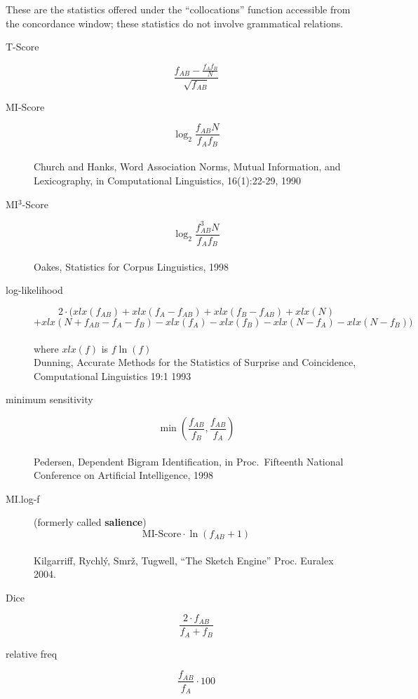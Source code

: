 \documentclass{article}
\begin{document}
These are the statistics offered under the ``collocations'' function accessible from the concordance window; these statistics do not involve grammatical relations.

\begin{description}
\item[T-Score] $$\frac{f_{AB} - \frac{f_A  f_B}{N}}{\sqrt{f_{AB}}}$$

\item[MI-Score] $$\log_2 \frac{f_{AB}  N}{f_A  f_B}$$
\\Church and Hanks, Word Association Norms,
 Mutual Information, and Lexicography, in Computational Linguistics,
 16(1):22-29, 1990

\item[MI$^3$-Score] $$\log_2 \frac{f_{AB}^3  N}{f_A  f_B}$$
\\Oakes, Statistics for Corpus Linguistics, 1998

\item[log-likelihood] $$2 \cdot (xlx(f_{AB}) + xlx(f_A - f_{AB}) + xlx(f_B - f_{AB}) + xlx(N)$$
		$$+ xlx (N + f_{AB} - f_A - f_B) - xlx(f_A) - xlx(f_B) - xlx(N - f_A) - xlx(N - f_B)) $$
\\where $xlx(f)$ is $ f  \ln (f)$
\\Dunning, Accurate Methods for the Statistics of Surprise and
 Coincidence, Computational Linguistics 19:1 1993

\item[minimum sensitivity] $$\min (\frac{f_{AB}}{f_B},\frac{f_{AB}}{f_A})$$
\\Pedersen, Dependent Bigram Identification, in Proc.\
  Fifteenth National Conference on Artificial Intelligence, 1998


\item[MI.log-f] (formerly called {\bf salience}) $$\text{MI-Score} \cdot \ln (f_{AB} + 1)$$
\\Kilgarriff, Rychlý, Smrž, Tugwell, ``The Sketch Engine'' Proc. Euralex 2004.


\item[Dice] $$ \frac{2 \cdot f_{AB}}{f_A + f_B} $$

\item[relative freq] $$ \frac{f_{AB}}{f_A} \cdot 100$$
\end{description}
\end{document}
